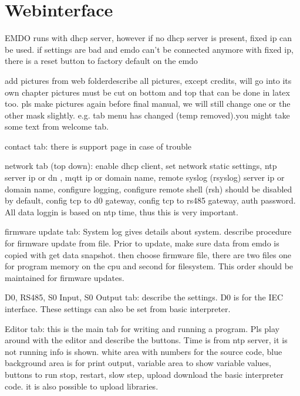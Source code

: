 \documentclass[11pt,fleqn]{book} %
\numberwithin{equation}{section} %
\numberwithin{figure}{section} %
\numberwithin{table}{section} %
\begin{document}
\chapter{Webinterface}

EMDO runs with dhcp server, however if no dhcp server is present, fixed ip can be used.
if settings are bad and emdo can't be connected anymore with fixed ip, there is a reset button to factory default on the emdo

add pictures from web folderdescribe all pictures, except credits, will go into its own chapter
pictures must be cut on bottom and top that can be done in latex too. pls make pictures again before final manual, we will still change one or the other mask slightly. e.g. tab menu has changed (temp removed).you might take some text from welcome tab.

contact tab: there is support page in case of trouble

network tab (top down): enable dhcp client, set network static settings, ntp server ip or dn , mqtt ip or domain name, remote syslog (rsyslog) server ip or domain name, configure logging, configure remote shell (rsh) should be disabled by default, config tcp to d0 gateway, config tcp to rs485 gateway, auth password.
All data loggin is based on ntp time, thus this is very important.

firmware update tab: System log gives details about system. describe procedure for firmware update from file. Prior to update, make sure data from emdo is copied with get data snapshot. then choose firmware file, there are two files one for program memory on the cpu and second for filesystem. This order should be maintained for firmware updates. 

D0, RS485, S0 Input, S0 Output tab: describe the settings. D0 is for the IEC interface. These settings can also be set from basic interpreter. 

Editor tab: this is the main tab for writing and running a program.  Pls play around with the editor and  describe the buttons. Time is from ntp server, it is not running info is shown. white area with numbers for the source code, blue background area is for print output, variable area to show variable values, buttons to run stop, restart, slow step, upload download the basic interpreter code. it is also possible to upload libraries.
\end{document}
